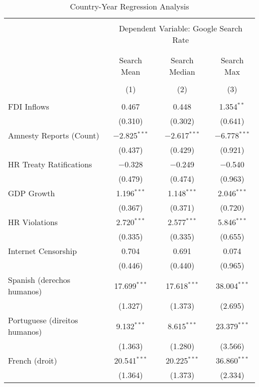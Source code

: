
\begin{table}[!htbp] \centering 
  \caption{Country-Year Regression Analysis} 
  \label{} 
\begin{tabular}{@{\extracolsep{5pt}}lccc} 
\\[-1.8ex]\hline 
\hline \\[-1.8ex] 
 & \multicolumn{3}{c}{Dependent Variable: Google Search Rate} \\ 
\cline{2-4} 
\\[-1.8ex] & \multicolumn{3}{c}{ } \\ 
 & Search Mean & Search Median & Search Max \\ 
\\[-1.8ex] & (1) & (2) & (3)\\ 
\hline \\[-1.8ex] 
 FDI Inflows & 0.467 & 0.448 & 1.354$^{**}$ \\ 
  & (0.310) & (0.302) & (0.641) \\ 
  Amnesty Reports (Count) & $-$2.825$^{***}$ & $-$2.617$^{***}$ & $-$6.778$^{***}$ \\ 
  & (0.437) & (0.429) & (0.921) \\ 
  HR Treaty Ratifications & $-$0.328 & $-$0.249 & $-$0.540 \\ 
  & (0.479) & (0.474) & (0.963) \\ 
  GDP Growth & 1.196$^{***}$ & 1.148$^{***}$ & 2.046$^{***}$ \\ 
  & (0.367) & (0.371) & (0.720) \\ 
  HR Violations & 2.720$^{***}$ & 2.577$^{***}$ & 5.846$^{***}$ \\ 
  & (0.335) & (0.335) & (0.655) \\ 
  Internet Censorship & 0.704 & 0.691 & 0.074 \\ 
  & (0.446) & (0.440) & (0.965) \\ 
  Spanish (derechos humanos) & 17.699$^{***}$ & 17.618$^{***}$ & 38.004$^{***}$ \\ 
  & (1.327) & (1.373) & (2.695) \\ 
  Portuguese (direitos humanos) & 9.132$^{***}$ & 8.615$^{***}$ & 23.379$^{***}$ \\ 
  & (1.363) & (1.280) & (3.566) \\ 
  French (droit) & 20.541$^{***}$ & 20.225$^{***}$ & 36.860$^{***}$ \\ 
  & (1.364) & (1.373) & (2.334) \\ 

\end{tabular}
\end{table}
